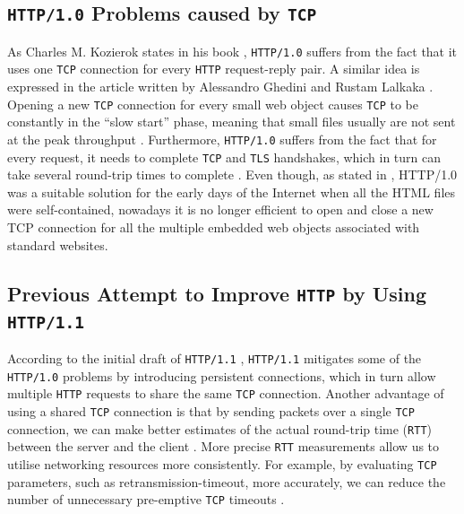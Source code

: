 \documentclass[12pt,a4paper,twoside,openright]{report}
\begin{document}
\subsection{\texttt{HTTP/1.0} Problems caused by \texttt{TCP}}
    As Charles M. Kozierok states in his book \cite{TCP_IP_Guide_Book},
    \texttt{HTTP/1.0} suffers from the fact that it uses one \texttt{TCP} connection for every \texttt{HTTP} request-reply pair. 
    A similar idea is expressed in the article written by Alessandro Ghedini and Rustam Lalkaka
    \cite{HTTP_3_the_past_the_present_and_the_future}.
    Opening a new \texttt{TCP} connection for every small web object causes \texttt{TCP} to be constantly in the \enquote{slow start} phase, meaning that small files usually are not sent at the peak throughput \cite{HTTP_3_the_past_the_present_and_the_future}.
    Furthermore, \texttt{HTTP/1.0} suffers from the fact that for every request, it needs to complete \texttt{TCP} and \texttt{TLS} handshakes, which in turn can take several round-trip times to complete \cite{HTTP_3_the_past_the_present_and_the_future}.
    Even though, as stated in \cite{TCP_IP_Guide_Book_2}, HTTP/1.0 was a suitable solution for the early days of the Internet when all the HTML files were self-contained, nowadays it is no longer efficient to open and close a new TCP connection for all the multiple embedded web objects associated with standard websites.

\subsection{Previous Attempt to Improve \texttt{HTTP} by Using \texttt{HTTP/1.1}}

According to the initial draft of \texttt{HTTP/1.1} \cite{RFC2068}, \texttt{HTTP/1.1} mitigates some of the \texttt{HTTP/1.0} problems by introducing persistent connections, which in turn allow multiple \texttt{HTTP} requests to share the same \texttt{TCP} connection.
Another advantage of using a shared \texttt{TCP} connection is that by sending packets over a single \texttt{TCP} connection, we can make better estimates of the actual round-trip time (\texttt{RTT}) between the server and the client \cite{bib_Computer_Networking_L6}.
More precise \texttt{RTT} measurements allow us to utilise networking resources more consistently.
For example, by evaluating \texttt{TCP} parameters, such as retransmission-timeout, more accurately, we can reduce the number of unnecessary pre-emptive \texttt{TCP} timeouts \cite{bib_rtt_tcp_Retransmissions}.
\end{document}
